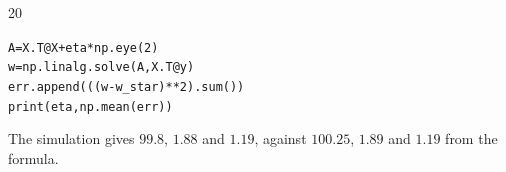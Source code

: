 \documentclass{sotonExamBoxes}    %
\begin{document}
\begin{question}{20}
\begin{qparts}
{\begin{answer}
\begin{alltt}
\hspace*{4em}A = X.T @ X + eta * np.eye(2)\\
\hspace*{4em}w = np.linalg.solve(A, X.T @ y)\\
\hspace*{4em}err.append(((w - w\_star)**2).sum())\\
\hspace*{2em}print(eta, np.mean(err))
\end{alltt}
        The simulation gives $99.8$, $1.88$ and $1.19$, against $100.25$,
        $1.89$ and $1.19$ from the formula.
      \end{answer}}{}

  \end{qparts}
\end{question}
\newpage

\end{document}
